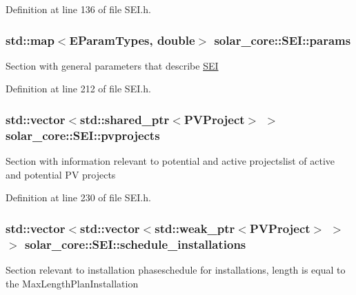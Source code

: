 Definition at line 136 of file S\+E\+I.\+h.

\hypertarget{classsolar__core_1_1_s_e_i_a811b998092171224983f9aefaa974707}{}
\subsubsection[{params}]{\setlength{\rightskip}{0pt plus 5cm}std\+::map$<${\bf E\+Param\+Types}, double$>$ solar\+\_\+core\+::\+S\+E\+I\+::params\hspace{0.3cm}{\ttfamily [protected]}}\label{classsolar__core_1_1_s_e_i_a811b998092171224983f9aefaa974707}
Section with general parameters that describe \hyperlink{classsolar__core_1_1_s_e_i}{S\+E\+I} 

Definition at line 212 of file S\+E\+I.\+h.

\hypertarget{classsolar__core_1_1_s_e_i_a76d9d151e51465d534ff0fd3d64f98bc}{}
\subsubsection[{pvprojects}]{\setlength{\rightskip}{0pt plus 5cm}std\+::vector$<$std\+::shared\+\_\+ptr$<${\bf P\+V\+Project}$>$ $>$ solar\+\_\+core\+::\+S\+E\+I\+::pvprojects\hspace{0.3cm}{\ttfamily [protected]}}\label{classsolar__core_1_1_s_e_i_a76d9d151e51465d534ff0fd3d64f98bc}
Section with information relevant to potential and active projectslist of active and potential P\+V projects 

Definition at line 230 of file S\+E\+I.\+h.

\hypertarget{classsolar__core_1_1_s_e_i_aacda4fae2c17d58672b60eba9c8cdc63}{}
\subsubsection[{schedule\+\_\+installations}]{\setlength{\rightskip}{0pt plus 5cm}std\+::vector$<$std\+::vector$<$std\+::weak\+\_\+ptr$<${\bf P\+V\+Project}$>$ $>$ $>$ solar\+\_\+core\+::\+S\+E\+I\+::schedule\+\_\+installations\hspace{0.3cm}{\ttfamily [protected]}}\label{classsolar__core_1_1_s_e_i_aacda4fae2c17d58672b60eba9c8cdc63}
Section relevant to installation phaseschedule for installations, length is equal to the Max\+Length\+Plan\+Installation 

